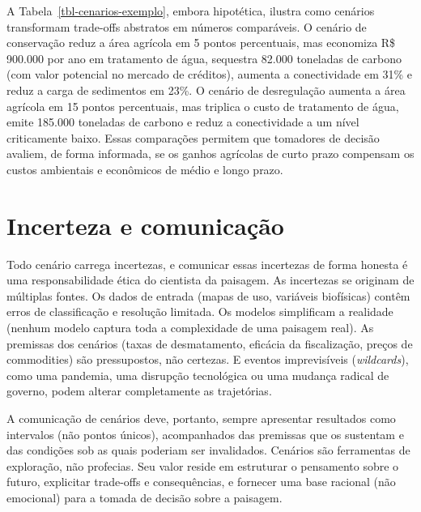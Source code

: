 \documentclass[
  portuguese,
  11pt,
  a4paper,
  open=any]{scrbook}
\begin{document}
A Tabela~\ref{tbl-cenarios-exemplo}, embora hipotética, ilustra como
cenários transformam trade-offs abstratos em números comparáveis. O
cenário de conservação reduz a área agrícola em 5 pontos percentuais,
mas economiza R\$ 900.000 por ano em tratamento de água, sequestra
82.000 toneladas de carbono (com valor potencial no mercado de
créditos), aumenta a conectividade em 31\% e reduz a carga de sedimentos
em 23\%. O cenário de desregulação aumenta a área agrícola em 15 pontos
percentuais, mas triplica o custo de tratamento de água, emite 185.000
toneladas de carbono e reduz a conectividade a um nível criticamente
baixo. Essas comparações permitem que tomadores de decisão avaliem, de
forma informada, se os ganhos agrícolas de curto prazo compensam os
custos ambientais e econômicos de médio e longo prazo.

\section{Incerteza e comunicação}\label{incerteza-e-comunicauxe7uxe3o}

Todo cenário carrega incertezas, e comunicar essas incertezas de forma
honesta é uma responsabilidade ética do cientista da paisagem. As
incertezas se originam de múltiplas fontes. Os dados de entrada (mapas
de uso, variáveis biofísicas) contêm erros de classificação e resolução
limitada. Os modelos simplificam a realidade (nenhum modelo captura toda
a complexidade de uma paisagem real). As premissas dos cenários (taxas
de desmatamento, eficácia da fiscalização, preços de commodities) são
pressupostos, não certezas. E eventos imprevisíveis (\emph{wildcards}),
como uma pandemia, uma disrupção tecnológica ou uma mudança radical de
governo, podem alterar completamente as trajetórias.

A comunicação de cenários deve, portanto, sempre apresentar resultados
como intervalos (não pontos únicos), acompanhados das premissas que os
sustentam e das condições sob as quais poderiam ser invalidados.
Cenários são ferramentas de exploração, não profecias. Seu valor reside
em estruturar o pensamento sobre o futuro, explicitar trade-offs e
consequências, e fornecer uma base racional (não emocional) para a
tomada de decisão sobre a paisagem.
\end{document}
